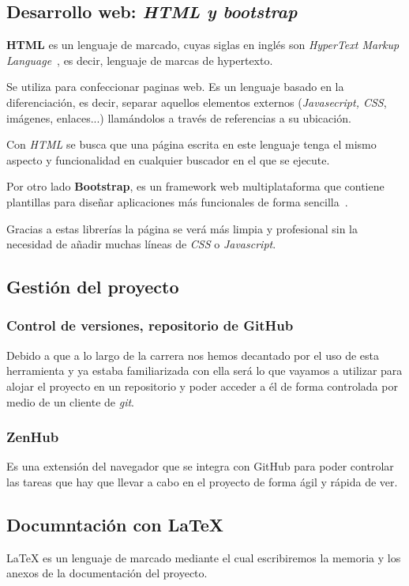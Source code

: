 \subsection{Desarrollo web: \textit{HTML y bootstrap}}
\textbf{HTML} es un lenguaje de marcado, cuyas siglas en inglés son \textit{HyperText Markup Language}~\cite{html}, es decir, lenguaje de marcas de hypertexto.

Se utiliza para confeccionar paginas web. Es un lenguaje basado en la diferenciación, es decir, separar aquellos elementos externos (\textit{Javasecript, CSS}, imágenes, enlaces...) llamándolos a través de referencias a su ubicación.

Con \textit{HTML} se busca que una página escrita en este lenguaje tenga el mismo aspecto y funcionalidad en cualquier buscador en el que se ejecute.

Por otro lado \textbf{Bootstrap}, es un  framework web multiplataforma que contiene plantillas para diseñar aplicaciones más funcionales de forma sencilla~\cite{bootstrap}.

Gracias a estas librerías la página se verá más limpia y profesional sin la necesidad de añadir muchas líneas de \textit{CSS} o \textit{Javascript}.
 

\subsection{Gestión del proyecto}
\subsubsection{Control de versiones, repositorio de GitHub}

Debido a que a lo largo de la carrera nos hemos decantado por el uso de esta herramienta y ya estaba familiarizada con ella será lo que vayamos a utilizar para alojar el proyecto en un repositorio y poder acceder a él de forma controlada por medio de un cliente de \textit{git}.

\subsubsection{ZenHub}
Es una extensión del navegador que se integra con GitHub para poder controlar las tareas que hay que llevar a cabo en el proyecto de forma ágil y rápida de ver.

\subsection{Documntación con \LaTeX{}}
\LaTeX{}\cite{tex} es un lenguaje de marcado mediante el cual escribiremos la memoria y los anexos de la documentación del proyecto.

